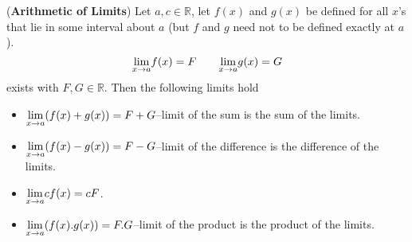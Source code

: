 \documentclass{beamer}
\begin{document}
\begin{frame}
\begin{tcolorbox}[width=\textwidth,colback={blue!10},title={},colbacktitle=yellow,coltitle=blue] 
	\begin{theorem}({\bf Arithmetic of Limits})
		Let $a,c\in \mathbb{R}$, let $f(x)$ and $g(x)$ be defined for all $x$'s that lie in some interval about $a$ (but $f$ and $g$ need not to be defined exactly at $a$).
		$$\underset{x\rightarrow a}{\rm lim}f(x)=F \quad \quad \underset{x\rightarrow a}{\rm lim}g(x)=G$$ 
		exists with $F,G\in \mathbb{R}$. Then the following limits hold
		\begin{itemize}
			\item 	$ \underset{x\rightarrow a}{\rm lim}(f(x)+g(x))=F+G$--limit of the sum is the sum of the limits. \pause
			\item $ \underset{x\rightarrow a}{\rm lim}(f(x)-g(x))=F-G$--limit of the difference is the difference of the limits. \pause 
			\item $\underset{x\rightarrow a}{\rm lim}cf(x)=cF$. \pause 
			\item $ \underset{x\rightarrow a}{\rm lim}(f(x).g(x))=F.G$--limit of the product is the product of the limits. 
		\end{itemize}
	\end{theorem}
\end{tcolorbox}
\end{frame}
\end{document}
